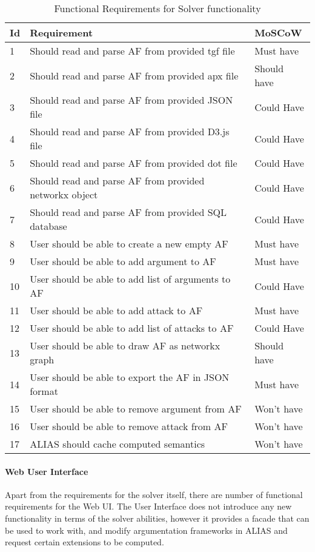 	\begin{longtable}{|p{0.5cm}|p{10cm}|p{2.5cm}|}
		\caption{Functional Requirements for Solver functionality}
		\label{table:functReqFunctionality}\\
		\hline
		\textbf{Id} & \textbf{Requirement} & \textbf{MoSCoW}  \\ \hline \hline
		1 & Should read and parse AF from provided tgf file & Must have \\ \hline
		2 & Should read and parse AF from provided apx file & Should have \\ \hline
		3 & Should read and parse AF from provided JSON file & Could Have \\ \hline
		4 & Should read and parse AF from provided D3.js file & Could Have \\ \hline
		5 & Should read and parse AF from provided dot file & Could Have \\ \hline
		6 & Should read and parse AF from provided networkx object & Could Have \\ \hline
		7 & Should read and parse AF from provided SQL database & Could Have \\ \hline
		8 & User should be able to create a new empty AF & Must have \\ \hline
		9 & User should be able to add argument to AF & Must have \\ \hline
		10 & User should be able to add list of arguments to AF & Could Have \\ \hline
		11 & User should be able to add attack to AF & Must have \\ \hline
		12 & User should be able to add list of attacks to AF & Could Have \\ \hline
		13 & User should be able to draw AF as networkx graph & Should have \\ \hline
		14 & User should be able to export the AF in JSON format & Must have \\ \hline
		15 & User should be able to remove argument from AF & Won't have \\ \hline
		16 & User should be able to remove attack from AF & Won't have \\ \hline
		17 & ALIAS should cache computed semantics & Won't have \\ \hline
	\end{longtable}%

\paragraph{Web User Interface} \label{section:WebUIRequirements}
Apart from the requirements for the solver itself, there are number of functional requirements for the Web UI. The User Interface does not introduce any new functionality in terms of the solver abilities, however it provides a facade that can be used to work with, and modify argumentation frameworks in ALIAS and request certain extensions to be computed. 

